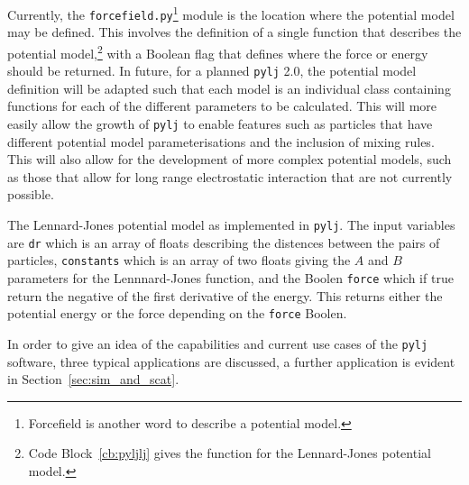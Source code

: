 Currently, the \texttt{forcefield.py}\footnote{Forcefield is another word to describe a potential model.} module is the location where the potential model may be defined.
This involves the definition of a single function that describes the potential model,\footnote{Code Block~\ref{cb:pyljlj} gives the function for the Lennard-Jones potential model.} with a Boolean flag that defines where the force or energy should be returned.
In future, for a planned \texttt{pylj} \num{2.0}, the potential model definition will be adapted such that each model is an individual class containing functions for each of the different parameters to be calculated.
This will more easily allow the growth of \texttt{pylj} to enable features such as particles that have different potential model parameterisations and the inclusion of mixing rules.
This will also allow for the development of more complex potential models, such as those that allow for long range electrostatic interaction that are not currently possible.
%
\begin{listing}
    \centering
    \caption{The Lennard-Jones potential model as implemented in \texttt{pylj}. The input variables are \texttt{dr} which is an array of floats describing the distences between the pairs of particles, \texttt{constants} which is an array of two floats giving the $A$ and $B$ parameters for the Lennnard-Jones function, and the Boolen \texttt{force} which if true return the negative of the first derivative of the energy. This returns either the potential energy or the force depending on the \texttt{force} Boolen.}
    
    \label{cb:pyljlj}
\end{listing}
%

In order to give an idea of the capabilities and current use cases of the \texttt{pylj} software, three typical applications are discussed, a further application is evident in Section~\ref{sec:sim_and_scat}.

